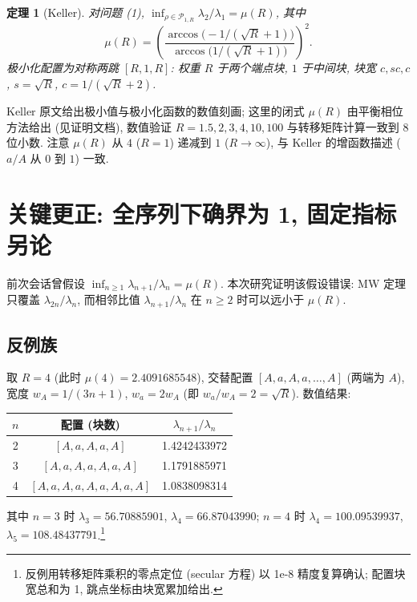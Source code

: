 \documentclass[UTF8]{ctexart}
\newtheorem{theorem}{定理}[section]
\begin{document}
\begin{theorem}[Keller]
对问题 (1), $\inf_{\rho \in \mathcal{P}_{1,R}} \lambda_2/\lambda_1 = \mu(R)$, 其中
\begin{equation}
	\mu(R) = \left( \frac{\arccos\!\bigl(-1/(\sqrt{R}+1)\bigr)}
	{\arccos\!\bigl(1/(\sqrt{R}+1)\bigr)} \right)^2 .
\end{equation}
极小化配置为对称两跳 $[R, 1, R]$: 权重 $R$ 于两个端点块, $1$ 于中间块,
块宽 $c, s c, c$, $s = \sqrt{R}$, $c = 1/(\sqrt{R}+2)$.
\end{theorem}

Keller 原文给出极小值与极小化函数的数值刻画; 这里的闭式 $\mu(R)$ 由平衡相位方法给出
(见证明文档), 数值验证 $R = 1.5, 2, 3, 4, 10, 100$ 与转移矩阵计算一致到 8 位小数.
注意 $\mu(R)$ 从 $4$ ($R=1$) 递减到 $1$ ($R \to \infty$), 与 Keller 的增函数描述 ($a/A$ 从 $0$ 到 $1$)
一致.

\section{关键更正: 全序列下确界为 1, 固定指标另论}

前次会话曾假设 $\inf_{n\geq 1} \lambda_{n+1}/\lambda_n = \mu(R)$.
本次研究证明该假设错误: MW 定理只覆盖 $\lambda_{2n}/\lambda_n$, 而相邻比值 $\lambda_{n+1}/\lambda_n$
在 $n \geq 2$ 时可以远小于 $\mu(R)$.

\subsection{反例族}

取 $R = 4$ (此时 $\mu(4) = 2.4091685548$), 交替配置 $[A,a,A,a,\dots,A]$ (两端为 $A$),
宽度 $w_A = 1/(3n+1)$, $w_a = 2w_A$ (即 $w_a/w_A = 2 = \sqrt{R}$). 数值结果:

\begin{center}
\begin{tabular}{ccc}
	\toprule
	$n$ & 配置 (块数) & $\lambda_{n+1}/\lambda_n$ \\
	\midrule
	2 & $[A,a,A,a,A]$ & 1.4242433972 \\
	3 & $[A,a,A,a,A,a,A]$ & 1.1791885971 \\
	4 & $[A,a,A,a,A,a,A,a,A]$ & 1.0838098314 \\
	\bottomrule
\end{tabular}
\end{center}

其中 $n = 3$ 时 $\lambda_3 = 56.70885901$, $\lambda_4 = 66.87043990$; $n = 4$ 时
$\lambda_4 = 100.09539937$, $\lambda_5 = 108.48437791$.\footnote{反例用转移矩阵乘积的零点定位 (secular 方程) 以 1e-8 精度复算确认; 配置块宽总和为 1, 跳点坐标由块宽累加给出.}
\end{document}

